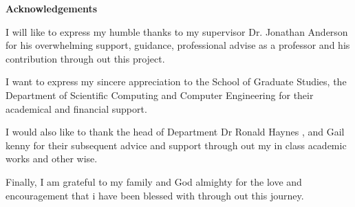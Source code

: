 \begin{center}
\textbf{\large Acknowledgements}
\end{center}

 \begin{center}
\begin{center}
\begin{flushleft}
I will like to express my humble thanks to my supervisor Dr. Jonathan Anderson for his overwhelming support, guidance, professional advise as a professor and his contribution through out this project.  
 
I want to express my sincere appreciation to the School of Graduate Studies, the Department of Scientific Computing and Computer Engineering for their academical and financial support.
 
I would also like to thank the head of Department Dr Ronald Haynes , and Gail kenny for their subsequent advice and support through out my in class academic works and other wise.
 
Finally, I am grateful to my family and God almighty for the love and encouragement that i have been blessed with through out this journey.
\end{flushleft}
\end{center}
 \end{center}

\hfill 
